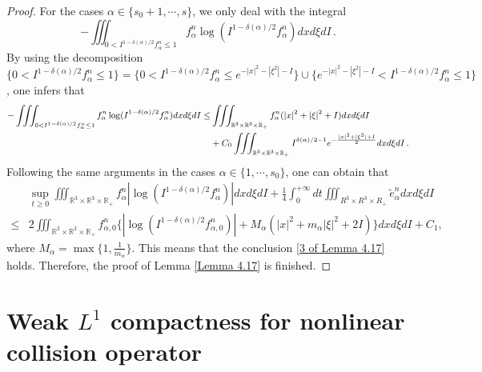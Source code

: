 \documentclass[reqno,11pt]{amsart}
\numberwithin{equation}{section}
\def\R{\mathbb{R}}
\begin{document}
\begin{proof}
For the cases $\alpha \in \{s_0+1,\cdots,s\}$, we only deal with the integral 
$$ - \iiint_{0 < I^{1-\delta(\alpha)/2}f^n_\alpha \leq 1 } f^n_\alpha \log (I^{1-\delta(\alpha)/2}f^n_\alpha) dxd\xi dI \,. $$ 
By using the decomposition $\{ 0 < I^{1-\delta(\alpha)/2}f^n_\alpha \leq 1 \} = \{ 0 < I^{1-\delta(\alpha)/2}f^n_\alpha \leq e^{ - |x|^2 - |\xi^2| - I } \} \cup \{ e^{ - |x|^2 - |\xi^2| - I } < I^{1-\delta(\alpha)/2}f^n_\alpha \leq 1 \}$, one infers that
\begin{equation*}{\small
  \begin{aligned}
    - \iiint_{0 < I^{1-\delta(\alpha)/2}f^n_\alpha \leq 1 } f^n_\alpha \log (I^{1-\delta(\alpha)/2}f^n_\alpha) dxd\xi dI \leq & \iiint_{ \R^3 \times \R^3\times \R_+} f^n_\alpha (|x|^2 + |\xi|^2 + I) dxd\xi dI \\
    & + C_0 \iiint_{ \R^3 \times \R^3\times \R_+} I^{\delta(\alpha)/2 - 1} e^{ -\frac{|x|^2 + |\xi^2| + I}{2}  } d x d \xi d I \,.
  \end{aligned}}
\end{equation*}
Following the same arguments in the cases $\alpha \in \{ 1, \cdots, s_0 \}$, one can obtain that
	\begin{equation}\label{f-C}
		\begin{aligned}
			&\sup \limits_{t\geq 0}\iiint_{ \R^3 \times \R^3\times \R_+} f^n_\alpha|\log (I^{1-\delta(\alpha)/2}f^n_\alpha)| dxd\xi dI +\tfrac{1}{4}\int_{0}^{+\infty} dt \iiint_{ R^3 \times R^3\times R_+} \tilde{e}^n_\alpha dxd\xi dI\\
			\leq & 2 \iiint_{ \R^3 \times \R^3\times \R_+} f^n_{\alpha,0}\{|\log (I^{1-\delta(\alpha)/2}f^n_{\alpha,0})|+M_\alpha (|x|^2+m_\alpha |\xi|^2 +2I)\}dxd\xi dI+C_1,
		\end{aligned}
	\end{equation}
	where $M_\alpha = \max \{1,\frac{1}{m_\alpha}\}$. This means that the conclusion \eqref{3 of Lemma 4.17} holds. Therefore, the proof of Lemma \ref{Lemma 4.17} is finished.
\end{proof}


\section{Weak $L^1$ compactness for nonlinear collision operator}\label{sec weak com}
\end{document}
